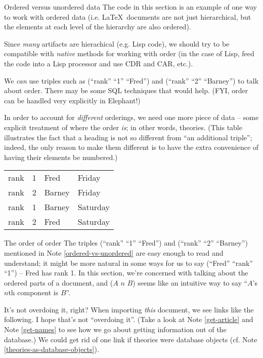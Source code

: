 \begin{notate}{Ordered versus unordered data} \label{ordered-vs-unordered}
The code in this section is an example of one way to work
with ordered data (i.e. \LaTeX\ documents are not just
hierarchical, but the elements at each level of the
hierarchy are also ordered).

Since \emph{many} artifacts are hierachical (e.g. Lisp
code), we should try to be compatible with \emph{native}
methods for working with order (in the case of Lisp, feed
the code into a Lisp processor and use CDR and CAR, etc.).

We \emph{can} use triples such as (``rank'' ``1''
``Fred'') and (``rank'' ``2'' ``Barney'') to talk about
order.  There may be some SQL techniques that would help.
(FYI, order can be handled very explicitly in Elephant!)

In order to account for \emph{different} orderings, we
need one more piece of data -- some explicit treatment of
where the order \emph{is}; in other words, theories.
(This table illustrates the fact that a heading is not so
different from ``an additional triple''; indeed, the only
reason to make them different is to have the extra
convenience of having their elements be numbered.)

\begin{center}
\begin{tabular}{|lll|l|}
\hline
rank & 1 & Fred & Friday \\
rank & 2 & Barney & Friday \\
rank & 1 & Barney & Saturday \\
rank & 2 & Fred & Saturday \\
\hline
\end{tabular}
\end{center}
\end{notate}

\begin{notate}{The order of order} \label{order-of-order}
The triples (``rank'' ``1'' ``Fred'') and (``rank'' ``2''
``Barney'') mentioned in Note \ref{ordered-vs-unordered}
are easy enough to read and understand; it might be more
natural in some ways for us to say (``Fred'' ``rank''
``1'') -- Fred has rank 1.  In this section, we're
concerned with talking about the ordered parts of a
document, and ($A$ $n$ $B$) seems like an intuitive way to
say ``$A$'s $n$th component is $B$''.
\end{notate}

\begin{notate}{It's not overdoing it, right?}
When importing \emph{this} document, we see links like the
following.  I hope that's not ``overdoing it''.  (Take a
look at Note \ref{get-article} and Note \ref{get-names} to
see how we go about getting information out of the
database.)  We could get rid of one link if theories were
database objects (cf. Note
\ref{theories-as-database-objects}).
\end{notate}

